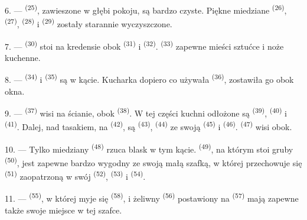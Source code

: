 \VUsaut{4.0mm}
\VUsaut{3.0mm}

6. ---  \textsuperscript{(25)}, zawieszone w głębi pokoju, są
bardzo czyste. Piękne miedziane  \textsuperscript{(26)},  \textsuperscript{(27)},  \textsuperscript{(28)} i 
\textsuperscript{(29)} zostały starannie wyczyszczone.

7. ---  \textsuperscript{(30)} stoi na kredensie obok  \textsuperscript{(31)} i  \textsuperscript{(32)}.
 \textsuperscript{(33)} zapewne mieści sztućce i noże kuchenne.

8. ---  \textsuperscript{(34)} i 
\textsuperscript{(35)} są w kącie. Kucharka dopiero co używała  \textsuperscript{(36)}, zostawiła go obok okna.

9. ---  \textsuperscript{(37)} wisi na ścianie, obok 
\textsuperscript{(38)}. W tej części kuchni odłożone są 
\textsuperscript{(39)},  \textsuperscript{(40)} i  \textsuperscript{(41)}. Dalej, nad tasakiem, na 
\textsuperscript{(42)}, są  \textsuperscript{(43)},  \textsuperscript{(44)} ze swoją  \textsuperscript{(45)} i
 \textsuperscript{(46)}.  \textsuperscript{(47)} wisi
obok.

10. --- Tylko miedziany  \textsuperscript{(48)} rzuca blask w tym kącie.
 \textsuperscript{(49)}, na którym stoi gruby 
\textsuperscript{(50)}, jest zapewne bardzo wygodny ze swoją małą szafką, w której
przechowuje się  \textsuperscript{(51)} zaopatrzoną w swój
 \textsuperscript{(52)},  \textsuperscript{(53)}
i  \textsuperscript{(54)}.

\VUsaut{4.0mm}
\VUsaut{3.0mm}

11. ---  \textsuperscript{(55)}, w której myje się 
\textsuperscript{(58)}, i żeliwny  \textsuperscript{(56)} postawiony na
 \textsuperscript{(57)} mają zapewne także swoje miejsce w tej szafce.

